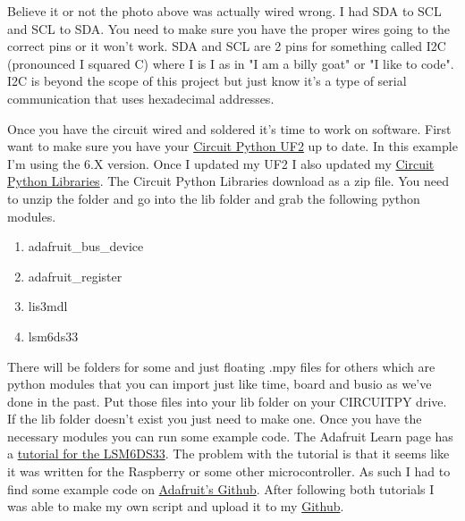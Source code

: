 Believe it or not the photo above was actually wired wrong. I had SDA to SCL and SCL to SDA. You need to make sure you have the proper wires going to the correct pins or it won’t work. SDA and SCL are 2 pins for something called I2C (pronounced I squared C) where I is I as in "I am a billy goat" or "I like to code". I2C is beyond the scope of this project but just know it’s a type of serial communication that uses hexadecimal addresses.

Once you have the circuit wired and soldered it’s time to work on software. First want to make sure you have your \href{https://circuitpython.org/downloads}{Circuit Python UF2} up to date. In this example I’m using the 6.X version. Once I updated my UF2 I also updated my \href{https://circuitpython.org/libraries}{Circuit Python Libraries}. The Circuit Python Libraries download as a zip file. You need to unzip the folder and go into the lib folder and grab the following python modules.
\begin{enumerate}[itemsep=-5pt]
\item adafruit\_bus\_device
\item adafruit\_register
\item lis3mdl
\item lsm6ds33
\end{enumerate}
There will be folders for some and just floating .mpy files for others which are python modules that you can import just like time, board and busio as we’ve done in the past. Put those files into your lib folder on your CIRCUITPY drive. If the lib folder doesn’t exist you just need to make one. Once you have the necessary modules you can run some example code. The Adafruit Learn page has a \href{https://learn.adafruit.com/lsm6ds33-6-dof-imu=accelerometer-gyro/python-circuitpython}{tutorial for the LSM6DS33}. The problem with the tutorial is that it seems like it was written for the Raspberry or some other microcontroller. As such I had to find some example code on \href{https://github.com/adafruit/Adafruit_CircuitPython_LSM6DS/blob/master/examples/lsm6ds_lsm6ds33_simpletest.py}{Adafruit's Github}. After following both tutorials I was able to make my own script and upload it to my \href{https://github.com/cmontalvo251/Microcontrollers/blob/master/Circuit_Playground/CircuitPython/Accelerometer/external_lis3mdl_lsm6dss.py}{Github}.
